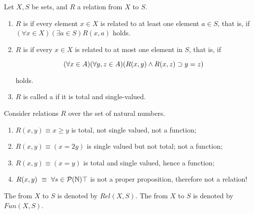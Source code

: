 \begin{definition}
  Let $X,S$ be sets, and $R$ a relation from $X$ to $S$.
  
  \begin{enumerate}
  \item $R$ is  if every element \(x \in X\) is related to at
    least one element \(a \in S\), that is, if
    \((\forall x \in X)(\exists a \in S)R(x, a)\) holds.

  \item $R$ is  if every \(x \in X\) is related to
    at most one element in $S$, that is, if

    \[
      \forallconn{x}{A}{
        \forallconn{y,z}{A}{
          (\implconn{
            \andconn{R(x,y)}{R(x,z)}
          }{
            y = z
          })
        }
      }
    \]

    holds.

  \item $R$ is called a  if it is total and single-valued.
  \end{enumerate}
\end{definition}

\begin{example}
  Consider relations $R$ over the set of natural numbers.

  \begin{enumerate}
  \item $R(x,y) \equiv  x \geq y$ is total, not single valued, not a function;
  \item $R(x,y) \equiv (x = 2y)$ is single valued but not total; not a function;
  \item $R(x,y) \equiv (x = y)$ is total and single valued, hence a function;
  \item $R(x,y)\ \equiv\ \forall s \in \mathcal{P}(\mathbb{N}) \top$ is not a proper proposition,
    therefore not a relation!
  \end{enumerate}
\end{example}
  

The  from $X$ to $S$ is denoted by
$Rel(X, S)$.  The  from \(X\) to
\(S\) is denoted by \(Fun(X, S)\).

